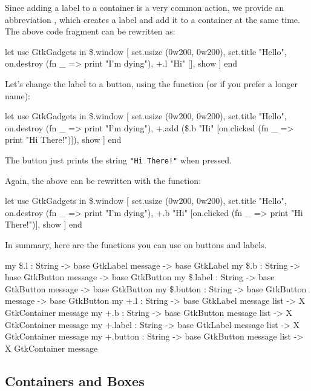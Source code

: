 \documentclass{article}
\begin{document}
Since adding a label to a container is a very common action,
we provide an abbreviation , which creates a label and
add it to a container 
at the same time.  The above code fragment can be rewritten as:
\begin{smldisp}
   let use GtkGadgets
   in  \$.window
        [ set.usize (0w200, 0w200),
          set.title "Hello",
          on.destroy (fn _ => print "I'm dying"),
          +.l "Hi" [],
          show
        ] 
   end
\end{smldisp}

Let's change the label to a button, using the function  (or
 if you prefer a longer name):
\begin{smldisp}
   let use GtkGadgets
   in  \$.window
        [ set.usize (0w200, 0w200),
          set.title "Hello",
          on.destroy (fn _ => print "I'm dying"),
          +.add (\$.b "Hi" [on.clicked (fn _ => print "Hi There!")]),
          show
        ] 
   end
\end{smldisp}

The button just prints the string \verb|"Hi There!"| when pressed.

Again, the above can be rewritten with the  function:
\begin{smldisp}
   let use GtkGadgets
   in  \$.window
        [ set.usize (0w200, 0w200),
          set.title "Hello",
          on.destroy (fn _ => print "I'm dying"),
          +.b "Hi" [on.clicked (fn _ => print "Hi There!")],
          show
        ] 
   end
\end{smldisp}

In summary, here are the functions you can use on buttons and labels.
\begin{smldisp}
   my \$.l      : String -> base GtkLabel message -> base GtkLabel
   my \$.b      : String -> base GtkButton message -> base GtkButton
   my \$.label  : String -> base GtkButton message -> base GtkButton
   my \$.button : String -> base GtkButton message -> base GtkButton
   my +.l      : String -> base GtkLabel message list 
                         -> X GtkContainer message
   my +.b      : String -> base GtkButton message list 
                         -> X GtkContainer message
   my +.label  : String -> base GtkLabel message list 
                         -> X GtkContainer message
   my +.button : String -> base GtkButton message list 
                         -> X GtkContainer message
\end{smldisp}

\subsection{Containers and Boxes}
\end{document}
